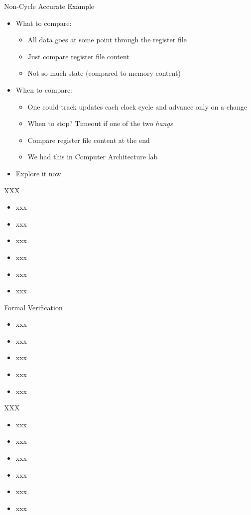 \begin{frame}[fragile]{Non-Cycle Accurate Example}
\begin{itemize}
\item What to compare:
\begin{itemize}
\item All data goes at some point through the register file
\item Just compare register file content
\item Not so much state (compared to memory content)
\end{itemize}
\item When to compare:
\begin{itemize}
\item One could track updates each clock cycle and advance only on a change
\item When to stop? Timeout if one of the two \emph{hangs}
\item Compare register file content at the end
\item We had this in Computer Architecture lab
\end{itemize}
\item Explore it now
\end{itemize}
\end{frame}

\begin{frame}[fragile]{XXX}
\begin{itemize}
\item xxx
\item xxx
\item xxx
\item xxx
\item xxx
\item xxx
\end{itemize}
\end{frame}

\begin{frame}[fragile]{Formal Verification}
\begin{itemize}
\item xxx
\item xxx
\item xxx
\item xxx
\item xxx
\end{itemize}
\end{frame}

\begin{frame}[fragile]{XXX}
\begin{itemize}
\item xxx
\item xxx
\item xxx
\item xxx
\item xxx
\item xxx
\end{itemize}
\end{frame}

